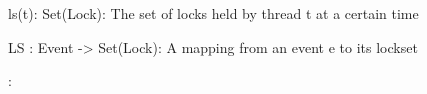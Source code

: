 \documentclass[landscape, a4paper]{article}
\begin{document}
\begin{minipage}[t]{0.19\linewidth}
\begin{betterlist}
		\item {}
		\begin{betterlist}
			\item ls(t): Set(Lock): The set of locks held by thread t at a certain time
			\item LS : Event -> Set(Lock): A mapping from an event e to its lockset
		\end{betterlist}
		\item {}:
		\vspace{-0.25cm}


\end{betterlist}
\end{minipage}
\end{document}
